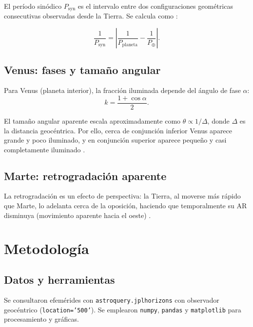 El período sinódico $P_{\text{syn}}$ es el intervalo entre dos configuraciones
geométricas consecutivas observadas desde la Tierra. Se calcula como
\citep{Portilla2001,Karttunen2007}:

\begin{equation}
\frac{1}{P_{\text{syn}}}=\left|\frac{1}{P_{\text{planeta}}}-\frac{1}{P_{\oplus}}\right|.
\label{eq:psyn}
\end{equation}

\subsection{Venus: fases y tamaño angular}

Para Venus (planeta interior), la fracción iluminada depende del ángulo de fase
$\alpha$:
\begin{equation}
k=\frac{1+\cos\alpha}{2}.
\label{eq:k}
\end{equation}

El tamaño angular aparente escala aproximadamente como $\theta\propto 1/\Delta$,
donde $\Delta$ es la distancia geocéntrica. Por ello, cerca de conjunción
inferior Venus aparece grande y poco iluminado, y en conjunción superior aparece
pequeño y casi completamente iluminado \citep{Karttunen2007,Galilei1610}.

\subsection{Marte: retrogradación aparente}

La retrogradación es un efecto de perspectiva: la Tierra, al moverse más rápido
que Marte, lo adelanta cerca de la oposición, haciendo que temporalmente su AR
disminuya (movimiento aparente hacia el oeste) \citep{Portilla2001,Karttunen2007}.

\section{Metodología}

\subsection{Datos y herramientas}

Se consultaron efemérides con \texttt{astroquery.jplhorizons} \citep{Ginsburg2019}
con observador geocéntrico (\texttt{location='500'}). Se emplearon
\texttt{numpy}, \texttt{pandas} y \texttt{matplotlib} para procesamiento y gráficas.

